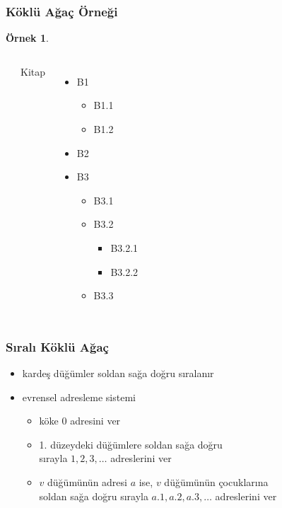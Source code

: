 \documentclass[dvipsnames]{beamer}
\theoremstyle{definition}
\theoremstyle{example}
\newtheorem{ornek}[theorem]{Örnek}
\theoremstyle{plain}
\begin{document}
\begin{frame}
  \frametitle{Köklü Ağaç Örneği}

  \begin{ornek}
    \begin{columns}
      \begin{center}
      \end{center}

      Kitap
      \begin{itemize}
        \item B1
        \begin{itemize}
          \item B1.1
          \item B1.2
        \end{itemize}
        \item B2
        \item B3
        \begin{itemize}
          \item B3.1
          \item B3.2
          \begin{itemize}
            \item B3.2.1
            \item B3.2.2
          \end{itemize}
          \item B3.3
        \end{itemize}
      \end{itemize}
    \end{columns}
  \end{ornek}
\end{frame}

\begin{frame}
  \frametitle{Sıralı Köklü Ağaç}

  \begin{itemize}
    \item kardeş düğümler soldan sağa doğru sıralanır

    \medskip
    \item \alert{evrensel adresleme sistemi}
    \begin{itemize}
      \item köke $0$ adresini ver
      \item 1. düzeydeki düğümlere soldan sağa doğru\\
        sırayla $1,2,3,\dots$ adreslerini ver
      \item $v$ düğümünün adresi $a$ ise, $v$ düğümünün çocuklarına\\
        soldan sağa doğru sırayla $a.1,a.2,a.3,\dots$ adreslerini ver
    \end{itemize}
  \end{itemize}
\end{frame}
\end{document}
